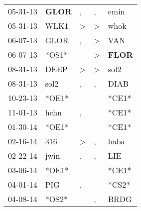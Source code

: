\begin{supertabular}{p{0.07\textwidth}p{0.06\textwidth}p{0.02\textwidth}p{0.02\textwidth}p{0.06\textwidth}}
          05-31-13\textsuperscript{} &  \textbf{GLOR\textsuperscript{}} &                , &                , &           emin\textsuperscript{} \\
          05-31-13\textsuperscript{} &           WLK1\textsuperscript{} &     \textgreater &     \textgreater &           whok\textsuperscript{} \\
          06-07-13\textsuperscript{} &           GLOR\textsuperscript{} &                , &     \textgreater &            VAN\textsuperscript{} \\
          06-07-13\textsuperscript{} &                            *OS1* &                  &     \textgreater &  \textbf{FLOR\textsuperscript{}} \\
          08-31-13\textsuperscript{} &           DEEP\textsuperscript{} &     \textgreater &     \textgreater &           sol2\textsuperscript{} \\
          08-31-13\textsuperscript{} &           sol2\textsuperscript{} &                , &                , &           DIAB\textsuperscript{} \\
          10-23-13\textsuperscript{} &                            *OE1* &                  &                  &                            *CE1* \\
          11-01-13\textsuperscript{} &           hchn\textsuperscript{} &                , &                  &                            *CE1* \\
          01-30-14\textsuperscript{} &                            *OE1* &                  &                  &                            *CE1* \\
          02-16-14\textsuperscript{} &            316\textsuperscript{} &     \textgreater &                , &           baba\textsuperscript{} \\
          02-22-14\textsuperscript{} &           jwin\textsuperscript{} &                , &                , &            LIE\textsuperscript{} \\
          03-06-14\textsuperscript{} &                            *OE1* &                  &                  &                            *CE1* \\
          04-01-14\textsuperscript{} &            PIG\textsuperscript{} &                , &                  &                            *CS2* \\
          04-08-14\textsuperscript{} &                            *OS2* &                  &                , &           BRDG\textsuperscript{} \\

\end{supertabular}
